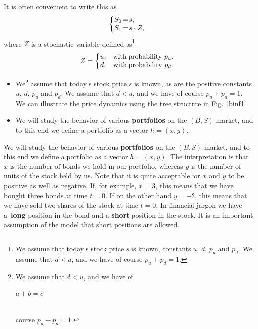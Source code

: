 \documentclass{Base}
\begin{document}
It is often convenient to write this as
\begin{equation*}
\left\{\begin{array}{@{}r@{}c@{}l}
S_0&\,{=}\,&s,\\
S_1&\,{=}\,&s \cdot Z,
\end{array}
\right.
\end{equation*}
where $Z$ is a stochastic variable defined as\footnote{We assume that today's stock price $s$ is known,
constants $u$, $d$, $p_u$ and $p_d$. We assume that $d<u$, and we have of
course $p_u+p_d=1$.}
\begin{equation*}
Z=\left\{\begin{array}{@{}c@{}c}
u,&\quad \mbox{with probability }p_u.\\
d,&\quad \mbox{with probability }p_d.
\end{array}
\right.
\end{equation*}
\begin{itemize}
\item We\footnote{We assume that $d<u$, and we have of\\[6pt]
\centerline{$a+b=c$}\\[6pt]
course $p_u+p_d=1$.} assume that today's stock price $s$ is known, as are the positive
constants $u$, $d$, $p_u$ and $p_d$. We assume that $d<u$, and we have of
course $p_u+p_d=1$. We can illustrate the price dynamics using the tree structure
in Fig.~\ref{binf1}.
\item We will study the behavior of various {\bf portfolios}
 on the $(B,S)$
market, and to this end we define a portfolio as a vector $h=(x,y)$.
\end{itemize}




We will study the behavior of various {\bf portfolios}
 on the $(B,S)$
market, and to this end we define a portfolio as a vector $h=(x,y)$. The
interpretation is that $x$ is the number of bonds we hold in our portfolio,
whereas $y$ is the number of units of the stock held by us. Note that it is
quite acceptable for $x$ and $y$ to be positive as well as negative. If, for example,
$x=3$, this means that we have bought three bonds at time $t=0$. If on the
other hand $y=-2$, this means that we have sold two shares of the stock at
time $t=0$. In financial jargon we have a~{\bf long} position in the bond
and a {\bf short} position in the stock. It is an important assumption of
the model that short positions are allowed.
\end{document}
